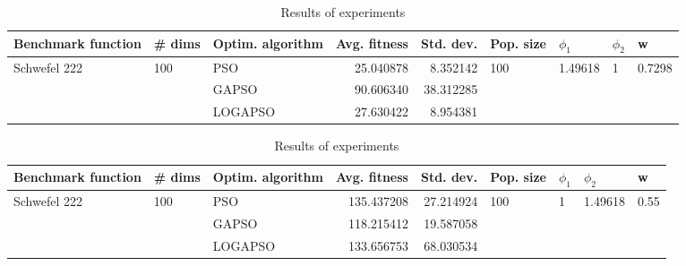 \documentclass{article}
\begin{document}
\begin{table}
\centering
\caption{Results of experiments}
\begin{tabular}{lllrrllll}
\toprule
           Benchmark function &              \# dims & Optim. algorithm &  Avg. fitness &  Std. dev. &            Pop. size &               $\phi_{1}$ &         $\phi_{2}$ &                       w \\
\midrule
\multirow{3}{*}{Schwefel 222} & \multirow{3}{*}{100} &              PSO &     25.040878 &   8.352142 & \multirow{3}{*}{100} & \multirow{3}{*}{1.49618} & \multirow{3}{*}{1} & \multirow{3}{*}{0.7298} \\
                              &                      &            GAPSO &     90.606340 &  38.312285 &                      &                          &                    &                         \\
                              &                      &          LOGAPSO &     27.630422 &   8.954381 &                      &                          &                    &                         \\
\bottomrule
\end{tabular}
\end{table}
\begin{table}
\centering
\caption{Results of experiments}
\begin{tabular}{lllrrllll}
\toprule
           Benchmark function &              \# dims & Optim. algorithm &  Avg. fitness &  Std. dev. &            Pop. size &         $\phi_{1}$ &               $\phi_{2}$ &                     w \\
\midrule
\multirow{3}{*}{Schwefel 222} & \multirow{3}{*}{100} &              PSO &    135.437208 &  27.214924 & \multirow{3}{*}{100} & \multirow{3}{*}{1} & \multirow{3}{*}{1.49618} & \multirow{3}{*}{0.55} \\
                              &                      &            GAPSO &    118.215412 &  19.587058 &                      &                    &                          &                       \\
                              &                      &          LOGAPSO &    133.656753 &  68.030534 &                      &                    &                          &                       \\
\bottomrule
\end{tabular}
\end{table}
\end{document}
